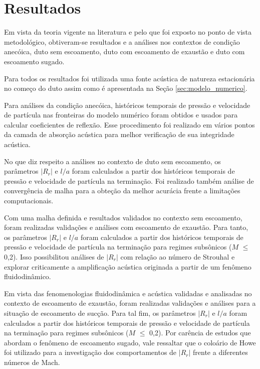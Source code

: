\chapter{Resultados}

Em vista da teoria vigente na literatura e pelo que foi exposto no ponto de vista metodológico, 
obtiveram-se resultados e a análises nos contextos de condição anecóica, duto sem escoamento, 
duto com escoamento de exaustão e duto com escoamento sugado.

Para todos os resultados foi utilizada uma fonte acústica de 
natureza estacionária no começo do duto 
assim como é apresentada na Seção \ref{sec:modelo_numerico}.

Para análises da condição anecóica, históricos temporais de pressão e 
velocidade de partícula nas fronteiras do modelo numérico foram 
obtidos e usados para calcular coeficientes de reflexão. 
Esse procedimento foi realizado em vários pontos da camada de 
absorção acústica para melhor verificação de sua integridade acústica.

No que diz respeito a análises no contexto de duto sem escoamento,
 os parâmetros $|R_{r}|$ e $l/a$ foram calculados a partir dos 
históricos temporais de pressão e velocidade de partícula na terminação.
 Foi realizado também análise de convergência de malha para a obteção 
 da melhor acurácia frente a limitações computacionais.

Com uma malha definida e resultados validados no contexto 
sem escoamento, foram realizadas validações e análises 
com escoamento de exaustão. 
Para tanto, os parâmetros $|R_{r}|$ e $l/a$ foram calculados
 a partir dos históricos temporais de pressão e velocidade 
 de partícula na terminação para regimes subsônicos ($M$ $\leq$ 0,2).
  Isso possibilitou análises de $|R_{r}|$ com relação ao número de 
  Strouhal e explorar criticamente a amplificação acústica originada a 
  partir de um fenômeno fluidodinâmico. 

Em vista das fenomenologias fluidodinâmica e acústica validadas
 e analisadas no contexto de escoamento de exaustão,
  foram realizadas validações e análises para 
  a situação de escoamento de sucção. 
  Para tal fim, os parâmetros $|R_{r}|$ e $l/a$ foram 
  calculados a partir dos históricos temporais de 
  pressão e velocidade de partícula na terminação para 
  regimes subsônicos ($M$ $\leq$ 0,2). 
  Por carência de estudos que abordam o fenômeno de 
  escoamento sugado, vale ressaltar que o coloário de 
  Howe foi utilizado para a investigação dos 
  comportamentos de $|R_{r}|$ frente a diferentes números de Mach.

